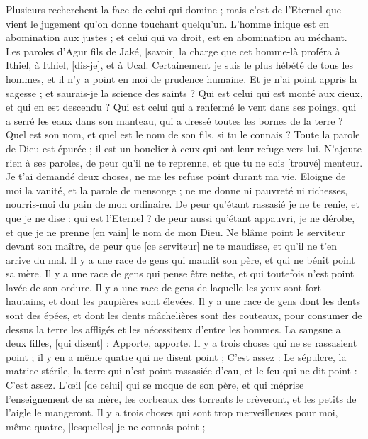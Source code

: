 \begin{multicols}{2}
Plusieurs recherchent la face de celui qui domine ; mais c'est de l'Eternel que vient le jugement qu'on donne touchant quelqu'un.
L'homme inique est en abomination aux justes ; et celui qui va droit, est en abomination au méchant.
\VerseOne{}Les paroles d'Agur fils de Jaké, [savoir] la charge que cet homme-là proféra à Ithiel, à Ithiel, [dis-je], et à Ucal.
Certainement je suis le plus hébété de tous les hommes, et il n'y a point en moi de prudence humaine.
Et je n'ai point appris la sagesse ; et saurais-je la science des saints ?
Qui est celui qui est monté aux cieux, et qui en est descendu ? Qui est celui qui a renfermé le vent dans ses poings, qui a serré les eaux dans son manteau, qui a dressé toutes les bornes de la terre ? Quel est son nom, et quel est le nom de son fils, si tu le connais ?
Toute la parole de Dieu est épurée ; il est un bouclier à ceux qui ont leur refuge vers lui.
N'ajoute rien à ses paroles, de peur qu'il ne te reprenne, et que tu ne sois [trouvé] menteur.
Je t'ai demandé deux choses, ne me les refuse point durant ma vie.
Eloigne de moi la vanité, et la parole de mensonge ; ne me donne ni pauvreté ni richesses, nourris-moi du pain de mon ordinaire.
De peur qu'étant rassasié je ne te renie, et que je ne dise : qui est l'Eternel ? de peur aussi qu'étant appauvri, je ne dérobe, et que je ne prenne [en vain] le nom de mon Dieu.
Ne blâme point le serviteur devant son maître, de peur que [ce serviteur] ne te maudisse, et qu'il ne t'en arrive du mal.
Il y a une race de gens qui maudit son père, et qui ne bénit point sa mère.
Il y a une race de gens qui pense être nette, et qui toutefois n'est point lavée de son ordure.
Il y a une race de gens de laquelle les yeux sont fort hautains, et dont les paupières sont élevées.
Il y a une race de gens dont les dents sont des épées, et dont les dents mâchelières sont des couteaux, pour consumer de dessus la terre les affligés et les nécessiteux d'entre les hommes.
La sangsue a deux filles, [qui disent] : Apporte, apporte. Il y a trois choses qui ne se rassasient point ; il y en a même quatre qui ne disent point ; C'est assez :
Le sépulcre, la matrice stérile, la terre qui n'est point rassasiée d'eau, et le feu qui ne dit point : C'est assez.
L'œil [de celui] qui se moque de son père, et qui méprise l'enseignement de sa mère, les corbeaux des torrents le crèveront, et les petits de l'aigle le mangeront.
Il y a trois choses qui sont trop merveilleuses pour moi, même quatre, [lesquelles] je ne connais point ;

\end{multicols}
